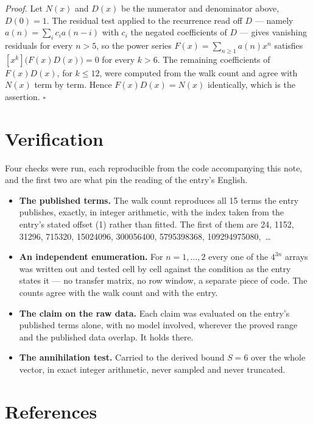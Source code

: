 \documentclass[11pt]{article}
\theoremstyle{definition}
\begin{document}
{\itshape Proof.} Let $N(x)$ and $D(x)$ be the numerator and denominator above, $D(0)=1$. The residual test applied to the recurrence read off $D$ --- namely $a(n) = \sum_i c_i a(n-i)$ with $c_i$ the negated coefficients of $D$ --- gives vanishing residuals for every $n > 5$, so the power series $F(x)=\sum_{n\ge 1}a(n)x^n$ satisfies $[x^k]\bigl(F(x)D(x)\bigr) = 0$ for every $k > 6$. The remaining coefficients of $F(x)D(x)$, for $k \le 12$, were computed from the walk count and agree with $N(x)$ term by term. Hence $F(x)D(x) = N(x)$ identically, which is the assertion. $\square$

\section{Verification}

Four checks were run, each reproducible from the code accompanying this note, and the first two are what pin the reading of the entry's English.

\begin{itemize}

\item {\bfseries The published terms.} The walk count reproduces all 15 terms the entry publishes, exactly, in integer arithmetic, with the index taken from the entry's stated offset (1) rather than fitted. The first of them are 24, 1152, 31296, 715320, 15024096, 300056400, 5795398368, 109294975080,~\dots

\item {\bfseries An independent enumeration.} For $n = 1,\dots,2$ every one of the $4^{3n}$ arrays was written out and tested cell by cell against the condition as the entry states it --- no transfer matrix, no row window, a separate piece of code. The counts agree with the walk count and with the entry.

\item {\bfseries The claim on the raw data.} Each claim was evaluated on the entry's published terms alone, with no model involved, wherever the proved range and the published data overlap. It holds there.

\item {\bfseries The annihilation test.} Carried to the derived bound $S = 6$ over the whole vector, in exact integer arithmetic, never sampled and never truncated.

\end{itemize}

\section{References}
\end{document}
